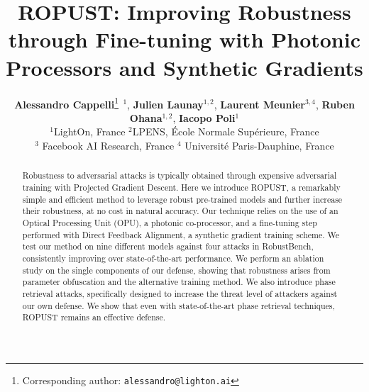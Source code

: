 \documentclass{article}
\title{ROPUST: Improving Robustness through Fine-tuning with Photonic Processors and Synthetic Gradients}
\author{%
  \textbf{Alessandro Cappelli}\thanks{Corresponding author: \texttt{alessandro@lighton.ai}} $^{\,1}$,
  \textbf{Julien Launay}$^{1,2}$,
  \textbf{Laurent Meunier}$^{3,4}$,
  \textbf{Ruben Ohana}$^{1,2}$,
  \textbf{Iacopo Poli}$^{1}$ \\
  $^{1}$LightOn, France \quad $^{2}$LPENS, École Normale Supérieure, France \\
  $^{3}$ Facebook AI Research, France \quad $^{4}$ Université Paris-Dauphine, France\\
}
\begin{document}
\maketitle


\begin{abstract}
Robustness to adversarial attacks is typically obtained through expensive adversarial training with Projected Gradient Descent. Here we introduce ROPUST, a remarkably simple and efficient method to leverage robust pre-trained models and further increase their robustness, at no cost in natural accuracy. Our technique relies on the use of an Optical Processing Unit (OPU), a photonic co-processor, and a fine-tuning step performed with Direct Feedback Alignment, a synthetic gradient training scheme. We test our method on nine different models against four attacks in RobustBench, consistently improving over state-of-the-art performance. We perform an ablation study on the single components of our defense, showing that robustness arises from parameter obfuscation and the alternative training method. We also introduce phase retrieval attacks, specifically designed to increase the threat level of attackers against our own defense. We show that even with state-of-the-art phase retrieval techniques, ROPUST remains an effective defense.
\end{abstract}
\end{document}
